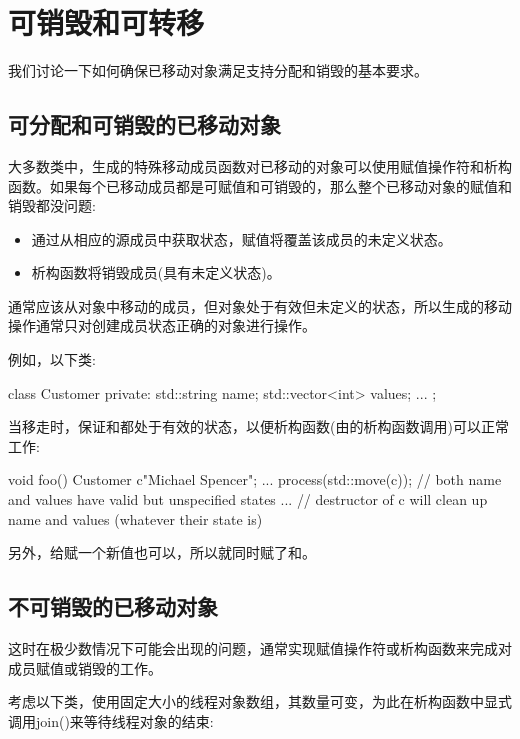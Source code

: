 \section{可销毁和可转移}
我们讨论一下如何确保已移动对象满足支持分配和销毁的基本要求。

\subsection{可分配和可销毁的已移动对象}

大多数类中，生成的特殊移动成员函数对已移动的对象可以使用赋值操作符和析构函数。如果每个已移动成员都是可赋值和可销毁的，那么整个已移动对象的赋值和销毁都没问题:

\begin{itemize}
	\item 通过从相应的源成员中获取状态，赋值将覆盖该成员的未定义状态。
	\item 析构函数将销毁成员(具有未定义状态)。
\end{itemize}

通常应该从对象中移动的成员，但对象处于有效但未定义的状态，所以生成的移动操作通常只对创建成员状态正确的对象进行操作。

例如，以下类:

\begin{cppcode}
class Customer {
private:
	std::string name;
	std::vector<int> values;
	...
};
\end{cppcode}

当移走时，保证和都处于有效的状态，以便析构函数(由的析构函数调用)可以正常工作:

\begin{cppcode}
void foo()
{
	Customer c{"Michael Spencer"};
	...
	process(std::move(c));
	// both name and values have valid but unspecified states
	...
} // destructor of c will clean up name and values (whatever their state is)
\end{cppcode}

另外，给赋一个新值也可以，所以就同时赋了和。

\subsection{不可销毁的已移动对象}

这时在极少数情况下可能会出现的问题，通常实现赋值操作符或析构函数来完成对成员赋值或销毁的工作。

考虑以下类，使用固定大小的线程对象数组，其数量可变，为此在析构函数中显式调用join()来等待线程对象的结束:

